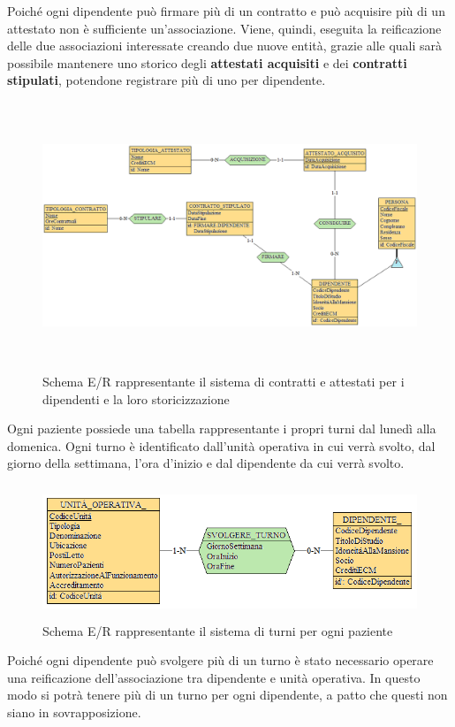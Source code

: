 \documentclass[a4paper, 12pt]{report}
\begin{document}
\noindent
Poiché ogni dipendente può firmare più di un contratto e può acquisire più di un attestato non è sufficiente un'associazione.
Viene, quindi, eseguita la reificazione delle due associazioni interessate creando due nuove entità, grazie alle quali sarà possibile
mantenere uno storico degli \textbf{attestati acquisiti} e dei \textbf{contratti stipulati}, potendone registrare più di uno per dipendente.

\begin{figure}[H]
        \centering
        \includegraphics[height=8cm]{img/dipendenteContrattiPostReif.png}
        \caption{Schema E/R rappresentante il sistema di contratti e attestati per i dipendenti e la loro storicizzazione}
\end{figure}

\noindent
Ogni paziente possiede una tabella rappresentante i propri turni dal lunedì alla domenica. Ogni turno è identificato dall'unità operativa
in cui verrà svolto, dal giorno della settimana, l'ora d'inizio e dal dipendente da cui verrà svolto.
\begin{figure}[H]
        \centering
        \includegraphics[height=4cm]{img/dipendenteTurniPreReif.png}
        \caption{Schema E/R rappresentante il sistema di turni per ogni paziente}
\end{figure}

\noindent
Poiché ogni dipendente può svolgere più di un turno è stato necessario operare una reificazione dell'associazione tra dipendente
e unità operativa. In questo modo si potrà tenere più di un turno per ogni dipendente, a patto che questi non siano in sovrapposizione.
\end{document}
